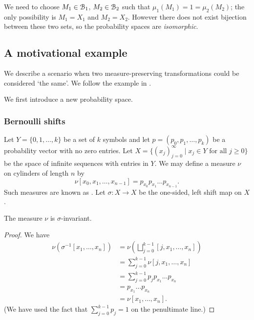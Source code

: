 We need to choose $M_1 \in \mathcal{B}_1$, $M_2 \in \mathcal{B}_2$ such that $\mu_1(M_1) = 1 = \mu_2(M_2)$; the only possibility is $M_1 = X_1$ and $M_2 = X_2$. However there does not exist bijection between these two sets, so the probability spaces are \emph{isomorphic}.

\subsection{A motivational example}
We describe a scenario when two measure-preserving transformations could be considered `the same'. We follow the example in \cite[p58]{walters:intro-to-ergodic-theory}.

We first introduce a new probability space.

\begin{comment}
Let $Y = \{0, 1\}$ and let $(p_0, p_1)$ be a probability vector with no zero entries. Then $(Y, 2^Y, \nu)$ is a measure space, with measure $\nu$ defined by $\nu(y) = p_y$ for $y \in Y$. Now let $X = \{(x_j)_{j = 0}^\infty \mid x_j \in Y\}$, the space of infinite sequences with entries in $Y = \{0, 1\}$.
\end{comment}
\subsubsection{Bernoulli shifts}
Let $Y = \{0, 1, \dots, k\}$ be a set of $k$ symbols and let $p = (p_0, p_1, \dots, p_k)$ be a probability vector with no zero entries. Let $X = \{(x_j)_{j = 0}^\infty \mid x_j \in Y \text{ for all } j \geq 0\}$ be the space of infinite sequences with entries in $Y$. We may define a measure $\nu$ on cylinders of length $n$ by
\[
	\nu[x_0, x_1, \dots, x_{n - 1}] = p_{x_0} p_{x_1} \dots p_{x_{n - 1}}.
\]
Such measures are known as . Let $\sigma : X \to X$ be the one-sided, left shift map on $X$.

\begin{proposition}
	The measure $\nu$ is $\sigma$-invariant.
	\begin{proof}
		We have
		\begin{align*}
			\nu(\sigma^{-1}[x_1, \dots, x_n]) &= \nu\left(\bigsqcup_{j = 0}^{k - 1}{[j, x_1, \dots, x_n]}\right) \\
				&= \sum_{j = 0}^{k - 1}{\nu[j, x_1, \dots, x_n]} \\
				&= \sum_{j = 0}^{k - 1}{p_j p_{x_1} \dots p_{x_n}} \\
				&= p_{x_1} \dots p_{x_n} \\
				&= \nu[x_1, \dots, x_n].
		\end{align*}
		(We have used the fact that $\sum_{j = 0}^{k - 1}{p_j} = 1$ on the penultimate line.)
	\end{proof}
\end{proposition}


